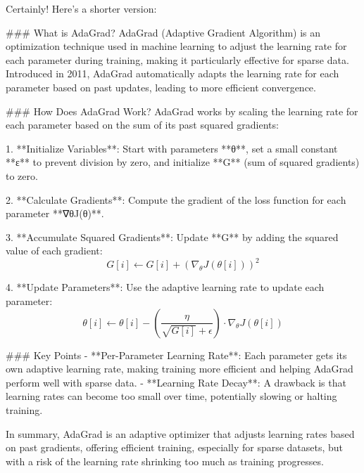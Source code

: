 


Certainly! Here’s a shorter version:

### What is AdaGrad?
AdaGrad (Adaptive Gradient Algorithm) is an optimization technique used in machine learning to adjust the learning rate for each parameter during training, making it particularly effective for sparse data. Introduced in 2011, AdaGrad automatically adapts the learning rate for each parameter based on past updates, leading to more efficient convergence.

### How Does AdaGrad Work?
AdaGrad works by scaling the learning rate for each parameter based on the sum of its past squared gradients:

1. **Initialize Variables**: Start with parameters **θ**, set a small constant **ε** to prevent division by zero, and initialize **G** (sum of squared gradients) to zero.

2. **Calculate Gradients**: Compute the gradient of the loss function for each parameter **∇θJ(θ)**.

3. **Accumulate Squared Gradients**: Update **G** by adding the squared value of each gradient:
   \[
   G[i] \gets G[i] + (\nabla_{\theta} J(\theta[i]))^2
   \]

4. **Update Parameters**: Use the adaptive learning rate to update each parameter:
   \[
   \theta[i] \gets \theta[i] - \left( \frac{\eta}{\sqrt{G[i]} + \epsilon} \right) \cdot \nabla_{\theta} J(\theta[i])
   \]

### Key Points
- **Per-Parameter Learning Rate**: Each parameter gets its own adaptive learning rate, making training more efficient and helping AdaGrad perform well with sparse data.
- **Learning Rate Decay**: A drawback is that learning rates can become too small over time, potentially slowing or halting training.

In summary, AdaGrad is an adaptive optimizer that adjusts learning rates based on past gradients, offering efficient training, especially for sparse datasets, but with a risk of the learning rate shrinking too much as training progresses.












